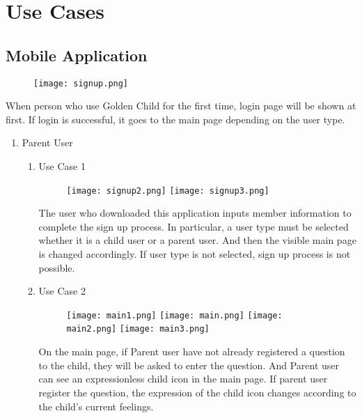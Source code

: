 \documentclass[conference]{IEEEtran}
\begin{document}
\section{\large{Use Cases}}
\subsection{Mobile Application}
\begin{figure}[H]
\centering
\texttt{[image: signup.png]}
\end{figure}
When person who use Golden Child for the first time, login page will be shown at first. If login is successful, it goes to the main page depending on the user type.
\begin{enumerate}
    \item Parent User
    \begin{enumerate}
    
        \item Use Case 1 
        \begin{figure}[H]
        \centering
        \texttt{[image: signup2.png]}
        \texttt{[image: signup3.png]}
        \end{figure}
        The user who downloaded this application inputs member information to complete the sign up process. In particular, a user type must be selected whether it is a child user or a parent user. And then the visible main page is changed accordingly. If user type is not selected, sign up process is not possible.
        
        \item Use Case 2
        \begin{figure}[H]
        \centering
        \texttt{[image: main1.png]}
        \texttt{[image: main.png]}
        \texttt{[image: main2.png]}
        \texttt{[image: main3.png]}
        \end{figure}
        On the main page, if Parent user have not already registered a question to the child, they will be asked to enter the question. And Parent user can see an expressionless child icon in the main page. If parent user register the question, the expression of the child icon changes according to the child's current feelings.
        

\end{enumerate}
\end{enumerate}
\end{document}
